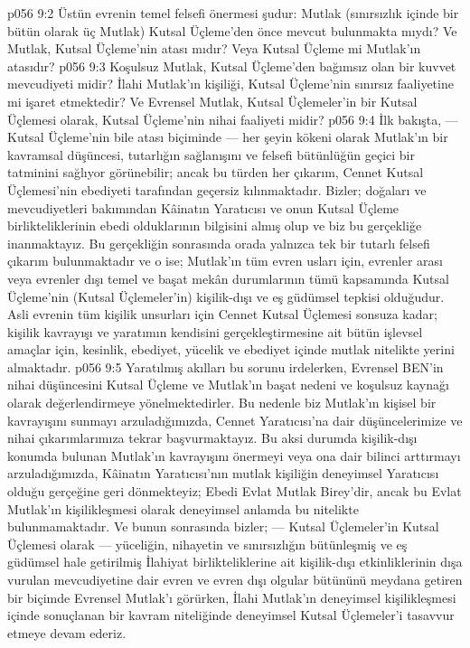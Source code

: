 \vs p056 9:2 Üstün evrenin temel felsefi önermesi şudur: Mutlak (sınırsızlık içinde bir bütün olarak üç Mutlak) Kutsal Üçleme’den önce mevcut bulunmakta mıydı? Ve Mutlak, Kutsal Üçleme’nin atası mıdır? Veya Kutsal Üçleme mi Mutlak’ın atasıdır?
\vs p056 9:3 Koşulsuz Mutlak, Kutsal Üçleme’den bağımsız olan bir kuvvet mevcudiyeti midir? İlahi Mutlak’ın kişiliği, Kutsal Üçleme’nin sınırsız faaliyetine mi işaret etmektedir? Ve Evrensel Mutlak, Kutsal Üçlemeler’in bir Kutsal Üçlemesi olarak, Kutsal Üçleme’nin nihai faaliyeti midir?
\vs p056 9:4 İlk bakışta, --- Kutsal Üçleme’nin bile atası biçiminde --- her şeyin kökeni olarak Mutlak’ın bir kavramsal düşüncesi, tutarlığın sağlanışını ve felsefi bütünlüğün geçici bir tatminini sağlıyor görünebilir; ancak bu türden her çıkarım, Cennet Kutsal Üçlemesi’nin ebediyeti tarafından geçersiz kılınmaktadır. Bizler; doğaları ve mevcudiyetleri bakımından Kâinatın Yaratıcısı ve onun Kutsal Üçleme birlikteliklerinin ebedi olduklarının bilgisini almış olup ve biz bu gerçekliğe inanmaktayız. Bu gerçekliğin sonrasında orada yalnızca tek bir tutarlı felsefi çıkarım bulunmaktadır ve o ise; Mutlak’ın tüm evren usları için, evrenler arası veya evrenler dışı temel ve başat mekân durumlarının tümü kapsamında Kutsal Üçleme’nin (Kutsal Üçlemeler’in) kişilik\hyp{}dışı ve eş güdümsel tepkisi olduğudur. Asli evrenin tüm kişilik unsurları için Cennet Kutsal Üçlemesi sonsuza kadar; kişilik kavrayışı ve yaratımın kendisini gerçekleştirmesine ait bütün işlevsel amaçlar için, kesinlik, ebediyet, yücelik ve ebediyet içinde mutlak nitelikte yerini almaktadır.
\vs p056 9:5 Yaratılmış akılları bu sorunu irdelerken, Evrensel BEN’in nihai düşüncesini Kutsal Üçleme ve Mutlak’ın başat nedeni ve koşulsuz kaynağı olarak değerlendirmeye yönelmektedirler. Bu nedenle biz Mutlak’ın kişisel bir kavrayışını sunmayı arzuladığımızda, Cennet Yaratıcısı’na dair düşüncelerimize ve nihai çıkarımlarımıza tekrar başvurmaktayız. Bu aksi durumda kişilik\hyp{}dışı konumda bulunan Mutlak’ın kavrayışını önermeyi veya ona dair bilinci arttırmayı arzuladığımızda, Kâinatın Yaratıcısı’nın mutlak kişiliğin deneyimsel Yaratıcısı olduğu gerçeğine geri dönmekteyiz; Ebedi Evlat Mutlak Birey’dir, ancak bu Evlat Mutlak’ın kişilikleşmesi olarak deneyimsel anlamda bu nitelikte bulunmamaktadır. Ve bunun sonrasında bizler; --- Kutsal Üçlemeler’in Kutsal Üçlemesi olarak --- yüceliğin, nihayetin ve sınırsızlığın bütünleşmiş ve eş güdümsel hale getirilmiş İlahiyat birlikteliklerine ait kişilik\hyp{}dışı etkinliklerinin dışa vurulan mevcudiyetine dair evren ve evren dışı olgular bütününü meydana getiren bir biçimde Evrensel Mutlak’ı görürken, İlahi Mutlak’ın deneyimsel kişilikleşmesi içinde sonuçlanan bir kavram niteliğinde deneyimsel Kutsal Üçlemeler’i tasavvur etmeye devam ederiz.
